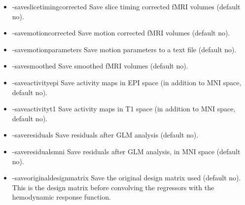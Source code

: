 \begin{itemize}
\item -saveslicetimingcorrected  
\newline \newline Save slice timing corrected fMRI volumes  (default no). 

\item -savemotioncorrected       
\newline \newline Save motion corrected fMRI volumes (default no). 

\item -savemotionparameters       
\newline \newline Save motion parameters to a text file (default no). 

\item -savesmoothed              
\newline \newline Save smoothed fMRI volumes (default no). 

\item -saveactivityepi           
\newline \newline Save activity maps in EPI space \newline (in addition to MNI space, default no). 

\item -saveactivityt1            
\newline \newline Save activity maps in T1 space \newline (in addition to MNI space, default no). 

\item -saveresiduals             
\newline \newline Save residuals after GLM analysis (default no). 

\item -saveresidualsmni          
\newline \newline Save residuals after GLM analysis, in MNI space (default no). 

\item -saveoriginaldesignmatrix  
\newline \newline Save the original design matrix used (default no). This is the design matrix before convolving the regressors with the hemodynamic response function.


\end{itemize}
